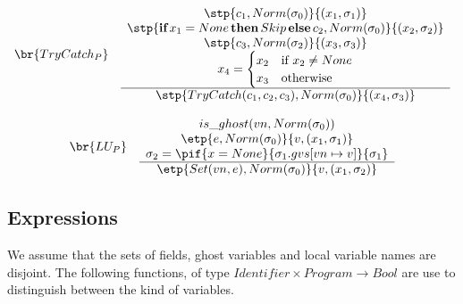 \begin{displaymath}
\begin{array}{lc}
\br{TryCatch_P}     &  
\begin{array}{c}
\stp{c_1, Norm(\sigma_0)}{(x_1,\sigma_1)}\\
\stp{\textbf{if}\, x_1=None\, \textbf{then}\, Skip\, \textbf{else}\, c_2, Norm(\sigma_0)}{(x_2, \sigma_2)}\\
\stp{c_3, Norm(\sigma_2)}{(x_3, \sigma_3)}\\
x_4 = \begin{cases}
x_2& \text{if } x_2 \neq None\\
x_3& \text{otherwise}
\end{cases}\\
\hline
\stp{TryCatch(c_1, c_2, c_3), Norm(\sigma_0)}{(x_4, \sigma_3)}
\end{array}
\end{array}
\end{displaymath}

\begin{displaymath}
\begin{array}{lc}
\br{LU_P}     &
\begin{array}{c}
is\_ghost(vn, Norm(\sigma_0))\\
\etp{e, Norm(\sigma_0)}{v, (x_1, \sigma_1)}\\
\sigma_2 = \pif{x = None}{\sigma_1.gvs[vn \mapsto v]}{\sigma_1}\\
\hline
\etp{Set(vn, e), Norm(\sigma_0)}{v, (x_1, \sigma_2)}
\end{array}
\end{array}
\end{displaymath}


\subsection*{Expressions}
We assume that the sets of fields, ghost variables and local variable names are disjoint. The following
functions, of type $Identifier \times Program \to Bool$ are use to distinguish between the kind of variables.

